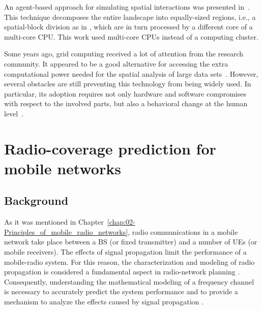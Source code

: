An agent-based approach for simulating spatial interactions was presented
in~\cite{Gong_Parallel_agent_based_simulation_of_individual_level_spatial_interactions_within_a_multicore_computing_environment:2012}.
This technique decomposes the entire landscape into equally-sized
regions, i.e., a spatial-block division as in \cite{Tabik-High_performance_three_horizon_composition_algorithm_for_large_scale_terrains:2011},
which are in turn processed by a different core of a multi-core CPU.
This work used multi-core CPUs instead of a computing cluster.

Some years ago, grid computing received a lot of attention from the
research community. It appeared to be a good alternative for accessing
the extra computational power needed for the spatial analysis of large
data sets~\cite{Armstrong_Using_a_computational_grid_for_geographic_information_analysis:2005,Vouk_Cloud_computing_issues_research_and_implementations:2008,Wang_A_cybergis_framework_for_the_synthesis_of_cyberinfrastructure_GIS_and_spatial_analysis:2010}.
However, several obstacles are still preventing this technology from
being widely used. In particular, its adoption requires not only hardware
and software compromises with respect to the involved parts, but also
a behavioral change at the human level~\cite{Armstrong_Using_a_computational_grid_for_geographic_information_analysis:2005}.


\section{Radio-coverage prediction for mobile networks \label{sec:04-Radio_coverage_prediction_for_mobile_networks}}


\subsection{Background}

As it was mentioned in Chapter~\ref{chap:02-Principles_of_mobile_radio_networks},
radio communications in a mobile network take place between a BS (or
fixed transmitter) and a number of UEs (or mobile receivers). The
effects of signal propagation limit the performance of a mobile-radio
system. For this reason, the characterization and modeling of radio
propagation is considered a fundamental aspect in radio-network planning
\cite{Ahmad:Studying_different_propagation_models_for_LTE_system:2012}.
Consequently, understanding the mathematical modeling of a frequency
channel is necessary to accurately predict the system performance
and to provide a mechanism to analyze the effects caused by signal
propagation \cite{Parsons-The_mobile_radio_propagation_channel:2000}.

